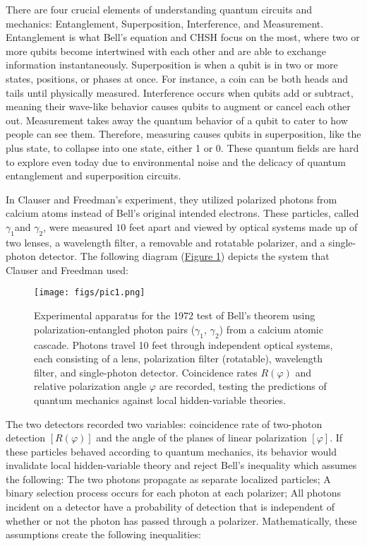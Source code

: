 \documentclass[a4paper, onecolumn, 11pt, titlepage]{quantumarticle}
\begin{document}
There are four crucial elements of understanding quantum circuits and mechanics: Entanglement, Superposition, Interference, and Measurement. Entanglement is what Bell's equation and CHSH focus on the most, where two or more qubits become intertwined with each other and are able to exchange information instantaneously. Superposition is when a qubit is in two or more states, positions, or phases at once. For instance, a coin can be both heads and tails until physically measured. Interference occurs when qubits add or subtract, meaning their wave-like behavior causes qubits to augment or cancel each other out. Measurement takes away the quantum behavior of a qubit to cater to how people can see them. Therefore, measuring causes qubits in superposition, like the plus state, to collapse into one state, either 1 or 0. These quantum fields are hard to explore even today due to environmental noise and the delicacy of quantum entanglement and superposition circuits. 

In Clauser and Freedman’s experiment, they utilized polarized photons from calcium atoms instead of Bell’s original intended electrons. These particles, called $\gamma_1$and $\gamma_2$, were measured $10$ feet apart and viewed by optical systems made up of two lenses, a wavelength filter, a removable and rotatable polarizer, and a single-photon detector. The following diagram (\hyperref[fig:system-diagram]{Figure 1}) depicts the system that Clauser and Freedman used: 

\begin{figure}
    \centering
    \texttt{[image: figs/pic1.png]}
    \caption{Experimental apparatus for the 1972 test of Bell’s theorem using polarization-entangled photon pairs ($\gamma_1$, $\gamma_2$) from a calcium atomic cascade. Photons travel 10 feet through independent optical systems, each consisting of a lens, polarization filter (rotatable), wavelength filter, and single-photon detector. Coincidence rates $R(\varphi)$ and relative polarization angle $\varphi$ are recorded, testing the predictions of quantum mechanics against local hidden-variable theories.}
    \label{fig:system-diagram}
\end{figure}

The two detectors recorded two variables: coincidence rate of two-photon detection $[R(\varphi)]$ and the angle of the planes of linear polarization $[\varphi]$. If these particles behaved according to quantum mechanics, its behavior would invalidate local hidden-variable theory and reject Bell’s inequality which assumes the following: The two photons propagate as separate localized particles; A binary selection process occurs for each photon at each polarizer; All photons incident on a detector have a probability of detection that is independent of whether or not the photon has passed through a polarizer. Mathematically, these assumptions create the following inequalities:
\end{document}
